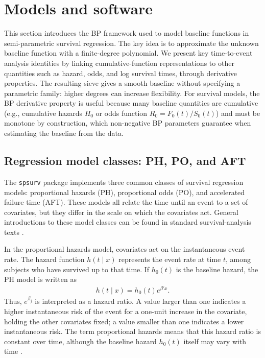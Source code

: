 \documentclass[5p,lefttitle]{elsarticle}
\begin{document}
\section{Models and software}\label{sec:models}

This section introduces the BP framework used to model baseline
functions in semi-parametric survival regression. The key idea is to
approximate the unknown baseline function with a finite-degree
polynomial. We present key time-to-event analysis identities by linking
cumulative-function representations to other quantities such as hazard,
odds, and log survival times, through derivative properties. The
resulting sieve gives a smooth baseline without specifying a parametric
family: higher degrees can increase flexibility. For survival models,
the BP derivative property is useful because many baseline quantities
are cumulative (e.g., cumulative hazards \(H_0\) or odds function \(R_0 = F_0(t)/S_0(t)\)) and must be monotone by
construction, which non-negative BP parameters guarantee when estimating
the baseline from the data.

\subsection{Regression model classes: PH, PO, and AFT}

The \texttt{spsurv} package implements three common classes of survival
regression models: proportional hazards (PH), proportional odds (PO), and
accelerated failure time (AFT). These models all relate the time until an
event to a set of covariates, but they differ in the scale on which the
covariates act. General introductions to these model classes can be found in
standard survival-analysis texts \citep{Klein:1997,kalbfleisch2002statistical,Collett2015}.

In the proportional hazards model, covariates act on the instantaneous event
rate. The hazard function \(h(t \mid x)\) represents the event rate at time
\(t\), among subjects who have survived up to that time. If \(h_0(t)\) is the
baseline hazard, the PH model is written as
{\begin{align}
h(t \mid x) = h_0(t)e^{\beta'x}.
\end{align}\normalsize}
Thus, \(e^{\beta_j}\) is interpreted as a hazard ratio. A value larger than
one indicates a higher instantaneous risk of the event for a one-unit increase
in the covariate, holding the other covariates fixed; a value smaller than one
indicates a lower instantaneous risk. The term proportional hazards means that
this hazard ratio is constant over time, although the baseline hazard
\(h_0(t)\) itself may vary with time \citep{Cox:1972}.
\end{document}
